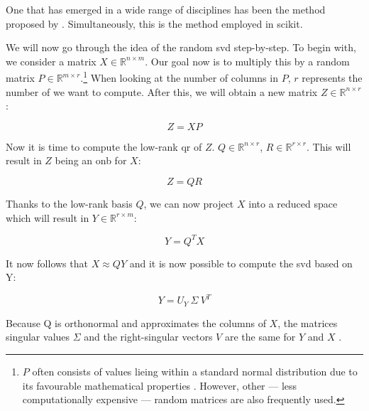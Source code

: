 One that has emerged in a wide range of disciplines has been the method proposed by .
Simultaneously, this is the method employed in \gls{scikit}.
\bigskip


We will now go through the idea of the random \gls{svd} step-by-step.
To begin with, we consider a matrix $X \in \mathbb{R}^{n \times m}$.
Our goal now is to multiply this by a random matrix $P \in \mathbb{R}^{m \times r}$.\footnote{%
$P$ often consists of values lieing within a standard normal distribution due to its favourable mathematical properties \cite{brunton2019data}. %
However, other --- less computationally expensive --- random matrices are also frequently used.%
}
When looking at the number of columns in $P$, $r$ represents the number of  we want to compute.
After this, we will obtain a new matrix $Z \in \mathbb{R}^{n \times r}$:

\vspace{-4mm}
\begin{equation}
	\label{formula:rSVDstepONE}
	Z = X P
\end{equation}

Now it is time to compute the low-rank \gls{qr} of $Z$.
$Q \in \mathbb{R}^{n \times r}$, $R \in \mathbb{R}^{r \times r}$. 
This will result in $Z$ being an \gls{onb} for $X$:

\vspace{-4mm}
\begin{equation}
	\label{formula:rSVDstepTWO}
	Z = Q R
\end{equation}

Thanks to the low-rank basis $Q$, we can now project $X$ into a reduced space which will result in $Y \in \mathbb{R}^{r \times m}$:

\vspace{-4mm}
\begin{equation}
	\label{formula:rSVDstepTHREE}
	Y = Q^T X
\end{equation}

It now follows that $X \approx QY$ \cite{brunton2019data} and it is now possible to compute the \gls{svd} based on Y:

\vspace{-4mm}
\begin{equation}
	\label{formula:rSVDstepFOUR}
	Y = U_Y \ \Sigma \ V^T
\end{equation}

Because Q is orthonormal and approximates the columns of $X$, the matrices singular values $\Sigma$ and the right-singular vectors $V$ are the same for $Y$ and $X$ \cite{brunton2019data}.

